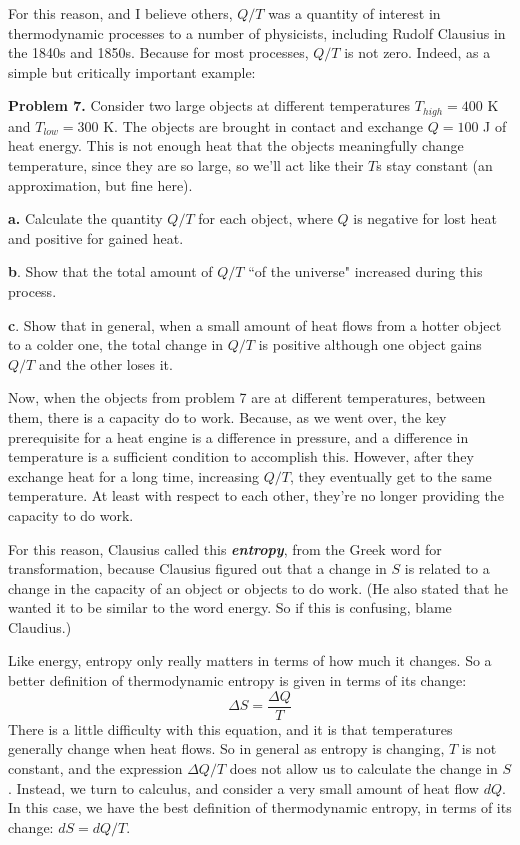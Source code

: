 \documentclass[12pt]{article}
\begin{document}
For this reason, and I believe others, $Q/T$ was a quantity of interest in thermodynamic processes to a number of physicists, including Rudolf Clausius in the 1840s and 1850s. Because for most processes, $Q/T$ is not zero. Indeed, as a simple but critically important example:

\textbf{Problem 7.} Consider two large objects at different temperatures $T_{high}=400$ K and $T_{low}=300$ K. The objects are brought in contact and exchange $Q=100$ J of heat energy. This is not enough heat that the objects meaningfully change temperature, since they are so large, so we'll act like their $T$s stay constant (an approximation, but fine here).

\textbf{a.} Calculate the quantity $Q/T$ for each object, where $Q$ is negative for lost heat and positive for gained heat.

\textbf{b}. Show that the total amount of $Q/T$ ``of the universe" increased during this process.

\textbf{c}. Show that in general, when a small amount of heat flows from a hotter object to a colder one, the total change in $Q/T$ is positive although one object gains $Q/T$ and the other loses it.

Now, when the objects from problem 7 are at different temperatures, between them, there is a capacity do to work. Because, as we went over, the key prerequisite for a heat engine is a difference in pressure, and a difference in temperature is a sufficient condition to accomplish this. However, after they exchange heat for a long time, increasing $Q/T$, they eventually get to the same temperature. At least with respect to each other, they're no longer providing the capacity to do work.

For this reason, Clausius called this \textit{\textbf{entropy}}, from the Greek word for transformation, because Clausius figured out that a change in $S$ is related to a change in the capacity of an object or objects to do work. (He also stated that he wanted it to be similar to the word energy. So if this is confusing, blame Claudius.)

Like energy, entropy only really matters in terms of how much it changes. So a better definition of thermodynamic entropy is given in terms of its change: 
\begin{equation}
\Delta S = \frac{\Delta Q}{T}
\end{equation}
There is a little difficulty with this equation, and it is that temperatures generally change when heat flows. So in general as entropy is changing, $T$ is not constant, and the expression $\Delta Q/T$ does not allow us to calculate the change in $S$. Instead, we turn to calculus, and consider a very small amount of heat flow $dQ$. In this case, we have the best definition of thermodynamic entropy, in terms of its change: $dS = dQ/T$.
\end{document}

